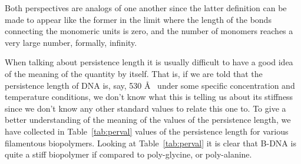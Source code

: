 Both  perspectives  are  analogs  of  one  another  since  the  latter
definition can  be made to appear  like the former in  the limit where
the length  of the bonds connecting  the monomeric units  is zero, and
the  number  of  monomers  reaches  a  very  large  number,  formally,
infinity.

When talking about persistence length  it is usually difficult to have
a good idea of  the meaning of the quantity by itself.  That is, if we
are told  that the persistence length  of DNA is, say,  530 \AA~ under
some specific concentration and  temperature conditions, we don't know
what this  is telling us about  its stiffness since we  don't know any
other  standard  values  to relate  this  one  to.  To give  a  better
understanding of the meaning of  the values of the persistence length,
we have collected in  Table~\ref{tab:perval} values of the persistence
length    for   various    filamentous   biopolymers.     Looking   at
Table~\ref{tab:perval}  it  is  clear  that  B-DNA is  quite  a  stiff
biopolymer if compared to poly-glycine, or poly-alanine.

